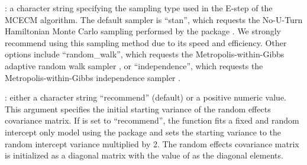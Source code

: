 : a character string specifying the sampling type used
in the E-step of the MCECM algorithm. The default sampler is ``stan'',
which requests the No-U-Turn Hamiltonian Monte Carlo sampling performed by
the  package \citep{stan2020, stan2017}. We strongly
recommend using this sampling method due to its speed and efficiency.
Other options include ``random\_walk'', which requests the
Metropolis-within-Gibbs adaptive random walk sampler
\citep{adaptMCMC2009}, or ``independence'', which requests the
Metropolis-within-Gibbs independence sampler \citep{compstats2012}.

: either a character string ``recommend'' (default)
or a positive numeric value. This argument specifies the initial
starting variance of the random effects covariance matrix. If
 is set to ``recommend'', the function fits a fixed
and random intercept only model using the  package and sets
the starting variance to the random intercept variance multiplied by 2.
The random effects covariance matrix is initialized as a diagonal matrix
with the value of  as the diagonal elements.

